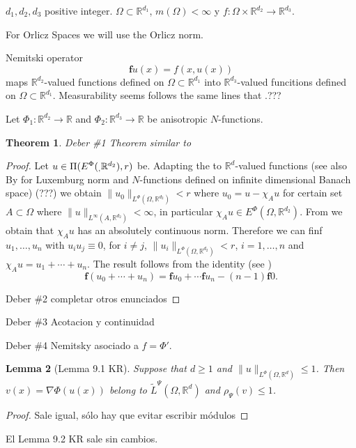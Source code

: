 \documentclass[twoside]{article}
\newtheorem{thm}{Theorem}[section]
\newtheorem{lem}[thm]{Lemma}
\theoremstyle{remark}
\newcommand{\linf}{L^{\infty}}
\newcommand{\lphi}[2]{L^{\Phi}(#1,\rr^{#2})}
\newcommand{\ephi}[2]{E^{\Phi}(#1,\rr^{#2})}
\renewcommand{\b}[1]{\boldsymbol{#1}}
\newcommand{\rr}{\mathbb{R}}
\newcommand{\franja}[2]{\Pi(\ephi_{#2},#1)}
\begin{document}
$d_1,d_2,d_3$ positive integer. 
$\Omega\subset\rr^{d_1}$, $m(\Omega)<\infty$ y $f:\Omega\times \rr^{d_2}\to\rr^{d_3}$.

For Orlicz Spaces we will use the Orlicz norm.


Nemitski operator
\[\b{f}u(x)=f(x,u(x))\]
maps  $\rr^{d_2}$-valued functions defined on $\Omega\subset\rr^{d_1}$ into   
$\rr^{d_3}$-valued funcitions defined on $\Omega\subset\rr^{d_1}$.  Measurability 
seems follows the same lines that \cite[p. 349]{krasnosel2011integral}.???

Let $\Phi_1:\rr^{d_2}\to\rr$ and $\Phi_2:\rr^{d_3}\to\rr$  be anisotropic $N$-functions. 

\begin{thm}
 Deber \#1 Theorem similar to \cite[Lemma 17.2]{KR}
\end{thm}


\begin{proof}
Let $u\in\franja{r}{d_2}$ be. Adapting  the \cite[Prop. 3, p. 92-93]{rao1991theory} 
to $\rr^d$-valued functions (see also \cite{} By \cite[Th. 5.5]{schappacher2005notion} 
for Luxemburg norm and $N$-functions defined on infinite dimensional Banach space) 
(???) we obtain $\|u_0\|_{\lphi{\Omega}{d_2}}<r$ where $u_0=u-\chi_A u$ for certain 
set $A\subset\Omega$ where $\|u\|_{\linf(A,\rr^{d_2})}<\infty$, in particular 
$ \chi_A u \in \ephi{\Omega}{d_2}$. From  
\cite[Th. 5.4]{schappacher2005notion} we obtain that $\chi_A u$ has an absolutely 
continuous norm. Therefore we can finf $u_1,\ldots,u_n$ with $u_iu_j\equiv 0$, for 
$i\neq j$, $\|u_i\|_{\lphi{\Omega}{d_2}}<r$, $i=1,\ldots,n$ and $\chi_Au=u_1+\cdots+u_n$. The
result follows  
from the identity (see \cite[p. 353]{krasnosel2011integral})
\[\b{f}(u_0+\cdots +u_n)=\b{f}u_0+\cdots \b{f}u_n-(n-1)\b{f}0.\]

Deber \#2 completar otros enunciados
\end{proof}


Deber \#3  Acotacion y continuidad


Deber \#4   Nemitsky asociado a $f=\Phi'$. 



\begin{lem}[Lemma 9.1 KR] Suppose that $d\geq 1$ and 
$\|u\|_{L^{\Phi}(\Omega,\rr^d)}\leq 1$. Then $v(x)=\nabla \Phi(u(x))$ belong to 
$\tilde{L}^{\Psi}(\Omega,\rr^d)$ and   $\rho_{\Psi}(v)\leq 1$.

\end{lem}
\begin{proof} Sale igual, sólo hay que evitar escribir módulos
 
\end{proof}

El Lemma 9.2 KR sale sin cambios. 


  
 
\end{document}
